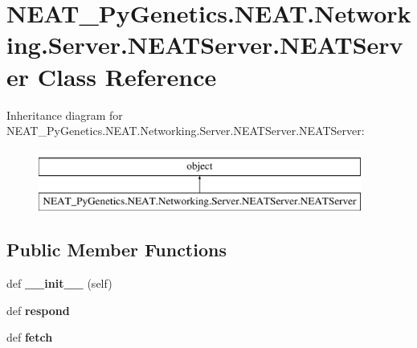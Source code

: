 \hypertarget{class_n_e_a_t___py_genetics_1_1_n_e_a_t_1_1_networking_1_1_server_1_1_n_e_a_t_server_1_1_n_e_a_t_server}{}\section{N\+E\+A\+T\+\_\+\+Py\+Genetics.\+N\+E\+A\+T.\+Networking.\+Server.\+N\+E\+A\+T\+Server.\+N\+E\+A\+T\+Server Class Reference}
\label{class_n_e_a_t___py_genetics_1_1_n_e_a_t_1_1_networking_1_1_server_1_1_n_e_a_t_server_1_1_n_e_a_t_server}
Inheritance diagram for N\+E\+A\+T\+\_\+\+Py\+Genetics.\+N\+E\+A\+T.\+Networking.\+Server.\+N\+E\+A\+T\+Server.\+N\+E\+A\+T\+Server\+:\begin{figure}[H]
\begin{center}
\leavevmode
\includegraphics[height=2.000000cm]{class_n_e_a_t___py_genetics_1_1_n_e_a_t_1_1_networking_1_1_server_1_1_n_e_a_t_server_1_1_n_e_a_t_server}
\end{center}
\end{figure}
\subsection*{Public Member Functions}
\begin{DoxyCompactItemize}
\item 
def {\bfseries \+\_\+\+\_\+init\+\_\+\+\_\+} (self)\hypertarget{class_n_e_a_t___py_genetics_1_1_n_e_a_t_1_1_networking_1_1_server_1_1_n_e_a_t_server_1_1_n_e_a_t_server_a45eb9c4003d9e0f4ae9c0e239423ddad}{}\label{class_n_e_a_t___py_genetics_1_1_n_e_a_t_1_1_networking_1_1_server_1_1_n_e_a_t_server_1_1_n_e_a_t_server_a45eb9c4003d9e0f4ae9c0e239423ddad}

\item 
def {\bfseries respond}\hypertarget{class_n_e_a_t___py_genetics_1_1_n_e_a_t_1_1_networking_1_1_server_1_1_n_e_a_t_server_1_1_n_e_a_t_server_a44ffcc6f56d71844827bd402bf4f0e63}{}\label{class_n_e_a_t___py_genetics_1_1_n_e_a_t_1_1_networking_1_1_server_1_1_n_e_a_t_server_1_1_n_e_a_t_server_a44ffcc6f56d71844827bd402bf4f0e63}

\item 
def {\bfseries fetch}\hypertarget{class_n_e_a_t___py_genetics_1_1_n_e_a_t_1_1_networking_1_1_server_1_1_n_e_a_t_server_1_1_n_e_a_t_server_adf4c43680aa89998cf65bc6499f778a8}{}\label{class_n_e_a_t___py_genetics_1_1_n_e_a_t_1_1_networking_1_1_server_1_1_n_e_a_t_server_1_1_n_e_a_t_server_adf4c43680aa89998cf65bc6499f778a8}

\end{DoxyCompactItemize}
